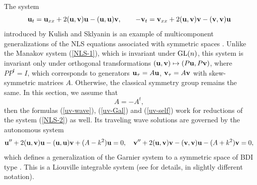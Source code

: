 \documentclass[11pt]{article}
\theoremstyle{plain}
\theoremstyle{definition}
\begin{document}
The system
\begin{equation}\label{NLS-2}
 {\bf u}_t={\bf u}_{xx}+2({\bf u},{\bf v}){\bf u}-({\bf u},{\bf u}){\bf v},\qquad 
-{\bf v}_t={\bf v}_{xx}+2({\bf u},{\bf v}){\bf v}-({\bf v},{\bf v}){\bf u}
\end{equation}
introduced by Kulish and Sklyanin \cite{Kulish_Sklyanin_1981} is an example of multicomponent generalizations of the NLS equations associated with symmetric spaces \cite{Fordy_Kulish_1983}. Unlike the Manakov system (\ref{NLS-1}), which is invariant under ${\rm GL}(n)$, this system is invariant only under orthogonal transformations $({\bf u},{\bf v})\mapsto(P{\bf u},P{\bf v})$, where $PP^t=I$, which corresponds to generators ${\bf u}_\tau=A{\bf u}$, ${\bf v}_\tau=A{\bf v}$ with skew-symmetric matrices $A$. Otherwise, the classical symmetry group remains the same. In this section, we assume that
\[
 A=-A^t,
\] 
then the formulas (\ref{uv-wave}), (\ref{uv-Gal}) and (\ref{uv-self}) work for reductions of the system (\ref{NLS-2}) as well. Its traveling wave solutions are governed by the autonomous system
\begin{equation}\label{KSGarnier}
 {\bf u}''+2({\bf u},{\bf v}){\bf u}-({\bf u},{\bf u}){\bf v}+(A-k^2){\bf u}=0,\quad 
 {\bf v}''+2({\bf u},{\bf v}){\bf v}-({\bf v},{\bf v}){\bf u}-(A+k^2){\bf v}=0,
\end{equation}
which defines a generalization of the Garnier system to a symmetric space of BDI type \cite{Fordy_Wojciechoski_Marshall_1986}. This is a Liouville integrable system (see \cite[Chapter 25.5]{Suris_2003} for details, in slightly different notation).
\end{document}
